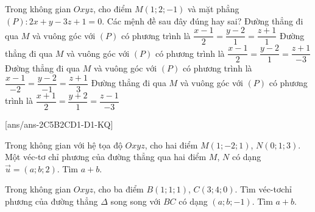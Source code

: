 \begin{ex}%
Trong không gian $Oxyz$, cho điểm $M(1;2;-1)$ và mặt phẳng $(P)\colon 2x+y-3z+1=0$. Các mệnh đề sau đây đúng hay sai?
\choiceTF
{ Đường thẳng đi qua $M$ và vuông góc với $(P)$ có phương trình là $\dfrac{x-1}{2}=\dfrac{y-2}{1}=\dfrac{z+1}{1}$}
{\True  Đường thẳng đi qua $M$ và vuông góc với $(P)$ có phương trình là $\dfrac{x-1}{2}=\dfrac{y-2}{1}=\dfrac{z+1}{-3}$}
{\True  Đường thẳng đi qua $M$ và vuông góc với ${(P)}$ có phương trình là $\dfrac{x-1}{-2}=\dfrac{y-2}{-1}=\dfrac{z+1}{3}$}
{Đường thẳng đi qua $M$ và vuông góc với $(P)$ có phương trình là $\dfrac{x+1}{2}=\dfrac{y+2}{1}=\dfrac{z-1}{-3}$}
\end{ex}


[ans/ans-2C5B2CD1-D1-KQ]
\TNSA
\begin{ex}%
Trong không gian với hệ tọa độ $Oxyz$, cho hai điểm $M\left( 1;-2;1 \right)$, $N\left( 0;1;3 \right)$. Một véc-tơ chỉ phương của đường thẳng qua hai điểm $M$, $N$ có dạng $\overrightarrow{u}=(a;b;2)$. Tìm $a+b.$
\end{ex}
\begin{ex}%
	Trong không gian $Oxyz$, cho ba điểm $B\left( 1;1;1 \right)$, $C\left( 3;4;0 \right)$. Tìm véc-tơchỉ phương của đường thẳng $\Delta $ song song với $BC$ có dạng $(a;b;-1)$. Tìm $a+b$.
\end{ex}

